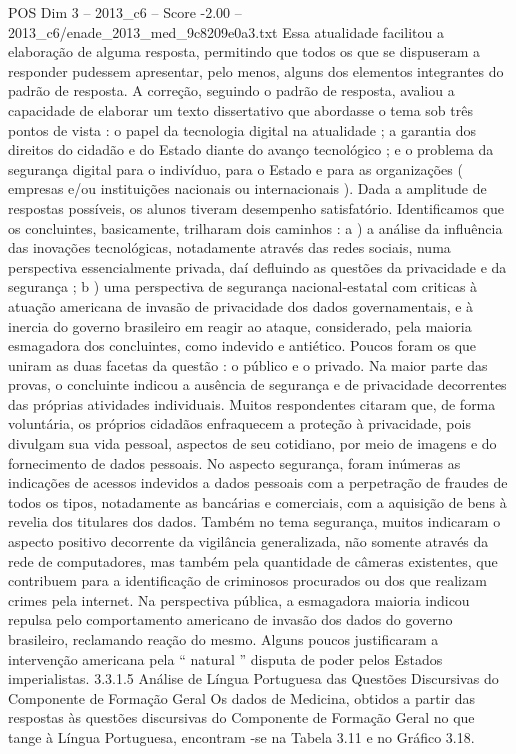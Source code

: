 \begin{textsample}{POS Dim 3 – 2013\_c6 – Score -2.00 – 2013\_c6/enade\_2013\_med\_9c8209e0a3.txt}
Essa atualidade facilitou a elaboração de alguma resposta, permitindo que todos os que se dispuseram a responder pudessem apresentar, pelo menos, alguns dos elementos integrantes do padrão de resposta.
A correção, seguindo o padrão de resposta, avaliou a capacidade de elaborar um texto dissertativo que abordasse o tema sob três pontos de vista : o papel da tecnologia digital na atualidade ; a garantia dos direitos do cidadão e do Estado diante do avanço tecnológico ; e o problema da segurança digital para o indivíduo, para o Estado e para as organizações ( empresas e/ou instituições nacionais ou internacionais ).
Dada a amplitude de respostas possíveis, os alunos tiveram desempenho satisfatório.
Identificamos que os concluintes, basicamente, trilharam dois caminhos : a ) a análise da influência das inovações tecnológicas, notadamente através das redes sociais, numa perspectiva essencialmente privada, daí defluindo as questões da privacidade e da segurança ; b ) uma perspectiva de segurança nacional-estatal com criticas à atuação americana de invasão de privacidade dos dados governamentais, e à inercia do governo brasileiro em reagir ao ataque, considerado, pela maioria esmagadora dos concluintes, como indevido e antiético.
Poucos foram os que uniram as duas facetas da questão : o público e o privado.
Na maior parte das provas, o concluinte indicou a ausência de segurança e de privacidade decorrentes das próprias atividades individuais.
Muitos respondentes citaram que, de forma voluntária, os próprios cidadãos enfraquecem a proteção à privacidade, pois divulgam sua vida pessoal, aspectos de seu cotidiano, por meio de imagens e do fornecimento de dados pessoais.
No aspecto segurança, foram inúmeras as indicações de acessos indevidos a dados pessoais com a perpetração de fraudes de todos os tipos, notadamente as bancárias e comerciais, com a aquisição de bens à revelia dos titulares dos dados.
Também no tema segurança, muitos indicaram o aspecto positivo decorrente da vigilância generalizada, não somente através da rede de computadores, mas também pela quantidade de câmeras existentes, que contribuem para a identificação de criminosos procurados ou dos que realizam crimes pela internet.
Na perspectiva pública, a esmagadora maioria indicou repulsa pelo comportamento americano de invasão dos dados do governo brasileiro, reclamando reação do mesmo.
Alguns poucos justificaram a intervenção americana pela “ natural ” disputa de poder pelos Estados imperialistas. 3.3.1.5 Análise de Língua Portuguesa das Questões Discursivas do Componente de Formação Geral Os dados de Medicina, obtidos a partir das respostas às questões discursivas do Componente de Formação Geral no que tange à Língua Portuguesa, encontram -se na Tabela 3.11 e no Gráfico 3.18.

\end{textsample}
